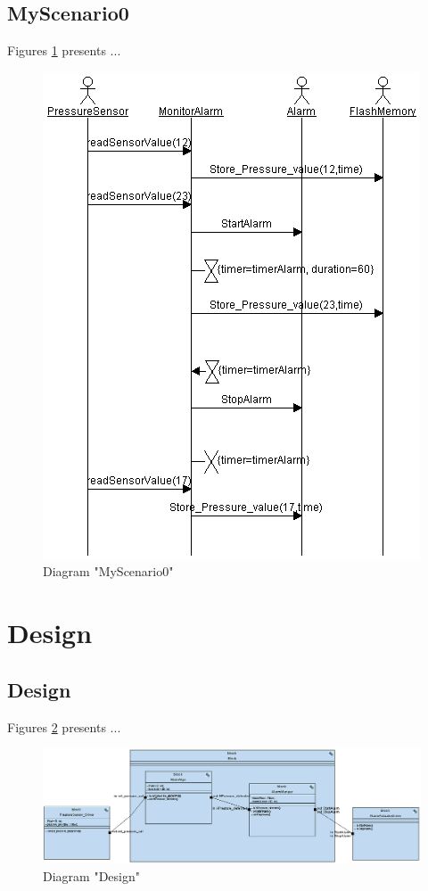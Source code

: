 \subsection{MyScenario0}
Figures \ref{fig:MyScenario0MyScenario012} presents ...
\begin{figure}[htb]
\centering
\includegraphics[width=\textwidth]{img_1_2.png}
\caption{Diagram "MyScenario0"}
\label{fig:MyScenario0MyScenario012}
\end{figure}

\section{Design}
\subsection{Design}
Figures \ref{fig:DesignDesign20} presents ...
\begin{figure}[htb]
\centering
\includegraphics[width=\textwidth]{img_2_0.png}
\caption{Diagram "Design"}
\label{fig:DesignDesign20}
\end{figure}

